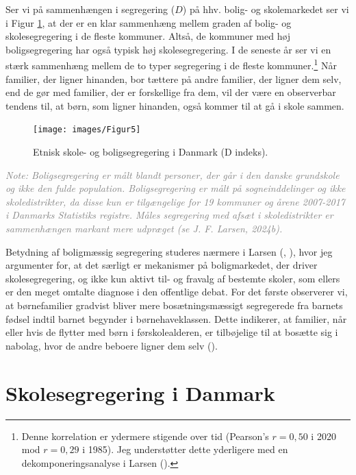 \documentclass[
]{book}
\begin{document}
Ser vi på sammenhængen i segregering (\(D\)) på hhv. bolig- og skolemarkedet ser vi i Figur \ref{fig:fig-4-4}, at der er en klar sammenhæng mellem graden af bolig- og skolesegregering i de fleste kommuner. Altså, de kommuner med høj boligsegregering har også typisk høj skolesegregering. I de seneste år ser vi en stærk sammenhæng mellem de to typer segregering i de fleste kommuner.\footnote{Denne korrelation er ydermere stigende over tid (Pearson's \(r=0,50\) i 2020 mod \(r=0,29\) i 1985). Jeg understøtter dette yderligere med en dekomponeringsanalyse i Larsen ().} Når familier, der ligner hinanden, bor tættere på andre familier, der ligner dem selv, end de gør med familier, der er forskellige fra dem, vil der være en observerbar tendens til, at børn, som ligner hinanden, også kommer til at gå i skole sammen.

\newpage

\begin{figure}
\texttt{[image: images/Figur5]} \caption{Etnisk skole- og boligsegregering i Danmark (D indeks).}\label{fig:fig-4-4}
\end{figure}

\begin{footnotesize}\textit{\textcolor{gray}{
Note: Boligsegregering er målt blandt personer, der går i den danske grundskole og ikke den fulde population. Boligsegregering er målt på sogneinddelinger og ikke skoledistrikter, da disse kun er tilgængelige for 19 kommuner og årene 2007-2017 i Danmarks Statistiks registre. Måles segregering med afsæt i skoledistrikter er sammenhængen markant mere udpræget (se J. F. Larsen, 2024b).
}}
\end{footnotesize}

Betydning af boligmæssig segregering studeres nærmere i Larsen (, ), hvor jeg argumenter for, at det særligt er mekanismer på boligmarkedet, der driver skolesegregering, og ikke kun aktivt til- og fravalg af bestemte skoler, som ellers er den meget omtalte diagnose i den offentlige debat. For det første observerer vi, at børnefamilier gradvist bliver mere bosætningsmæssigt segregerede fra barnets fødsel indtil barnet begynder i børnehaveklassen. Dette indikerer, at familier, når eller hvis de flytter med børn i førskolealderen, er tilbøjelige til at bosætte sig i nabolag, hvor de andre beboere ligner dem selv ().

\section{Skolesegregering i Danmark}\label{skolesegregering-i-danmark}
\end{document}
